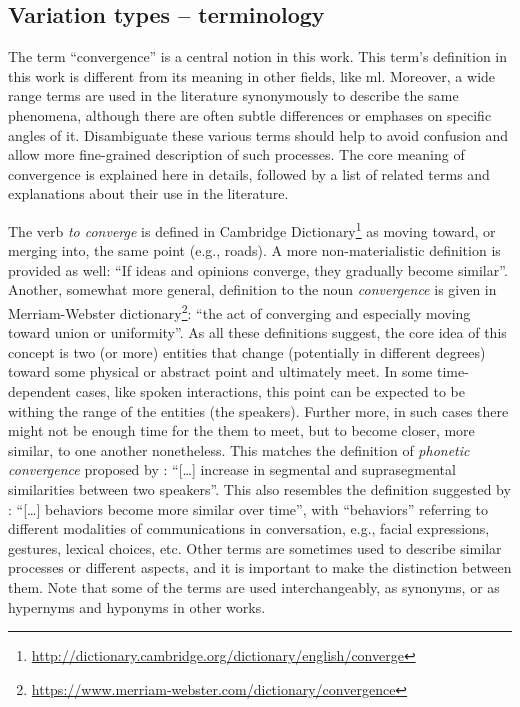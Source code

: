 
\subsection{Variation types -- terminology}
\label{subsec:variation_types}

The term \enquote{convergence} is a central notion in this work.
This term's definition in this work is different from its meaning in other fields, like \ac{ml}.
Moreover, a wide range terms are used in the literature synonymously to describe the same phenomena, although there are often subtle differences or emphases on specific angles of it.
Disambiguate these various terms should help to avoid confusion and allow more fine-grained description of such processes.
The core meaning of convergence is explained here in details, followed by a list of related terms and explanations about their use in the literature.

The verb \textit{to converge} is defined in Cambridge Dictionary\footnote{\url{http://dictionary.cambridge.org/dictionary/english/converge}} as moving toward, or merging into, the same point (e.g., roads).
A more non-materialistic definition is provided as well: \enquote{If ideas and opinions converge, they gradually become similar}.
Another, somewhat more general, definition to the noun \textit{convergence} is given in Merriam-Webster dictionary\footnote{\url{https://www.merriam-webster.com/dictionary/convergence}}: \enquote{the act of converging and especially moving toward union or uniformity}.
As all these definitions suggest, the core idea of this concept is two (or more) entities that change (potentially in different degrees) toward some physical or abstract point and ultimately meet.
In some time-dependent cases, like spoken interactions, this point can be expected to be withing the range of the entities (the speakers).
Further more, in such cases there might not be enough time for the them to meet, but to become closer, more similar, to one another nonetheless.
This matches the definition of \emph{phonetic convergence} proposed by \citet{Pardo2006phonetic}: \enquote{[\ldots] increase in segmental and suprasegmental similarities between two speakers}.
This also resembles the definition suggested by \citet{Xia2014prosodic}: \enquote{[\ldots] behaviors become more similar over time}, with \enquote{behaviors} referring to different modalities of communications in conversation, e.g., facial expressions, gestures, lexical choices, etc.
Other terms are sometimes used to describe similar processes or different aspects, and it is important to make the distinction between them.
Note that some of the terms are used interchangeably, as synonyms, or as hypernyms and hyponyms in other works.

